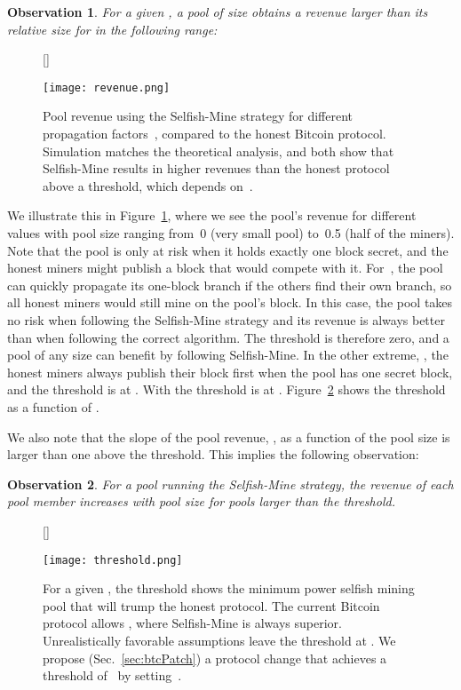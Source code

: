 \documentclass[letterpaper]{llncs}
\newtheorem{observation}{Observation}
\begin{document}
\begin{observation} \label{obs:threshold}
For a given , a pool of size  obtains a revenue larger than its relative size for  in the following range: 
 
\end{observation}

\begin{figure}[t]
[\FBwidth]{
\caption{
Pool revenue using the Selfish-Mine strategy for different propagation factors~, compared to the honest Bitcoin protocol. 
Simulation matches the theoretical analysis, and both show that Selfish-Mine results in higher revenues than the honest protocol above a threshold, which depends on~. 
}
\label{fig:revenue}
}{
\texttt{[image: revenue.png]}
}
\end{figure}

We illustrate this in Figure~\ref{fig:revenue}, where we see the pool's revenue for different~ values with pool size ranging from~0 (very small pool) to~0.5 (half of the miners). 
Note that the pool is only at risk when it holds exactly one block secret, and the honest miners might publish a block that would compete with it. 
For~, the pool can quickly propagate its one-block branch if the others find their own branch, so all honest miners would still mine on the pool's block. In this case, the pool takes no risk when following the Selfish-Mine strategy and its revenue is always better than when following the correct algorithm. The threshold is therefore zero, and a pool of any size can benefit by following Selfish-Mine. In the other extreme, , the honest miners always publish their block first when the pool has one secret block, and the threshold is at . With  the threshold is at . Figure~\ref{fig:threshold} shows the threshold as a function of . 

We also note that the slope of the pool revenue, \RPool, as a function of the pool size is larger than one above the threshold. This implies the following observation: 

\begin{observation} \label{obs:increasing}
For a pool running the Selfish-Mine strategy, the revenue of each pool member increases with pool size for pools larger than the threshold. 
\end{observation}



\begin{figure}[t]
[\FBwidth]{
\caption{
For a given , the threshold  shows the minimum power selfish mining pool that will trump the honest protocol. 
The current Bitcoin protocol allows , where Selfish-Mine is always superior. 
Unrealistically favorable assumptions leave the threshold at . 
We propose (Sec.~\ref{sec:btcPatch}) a protocol change that achieves a threshold of~ by setting~. 
}
\label{fig:threshold}
}{
\texttt{[image: threshold.png]}
}
\end{figure}
\end{document}
